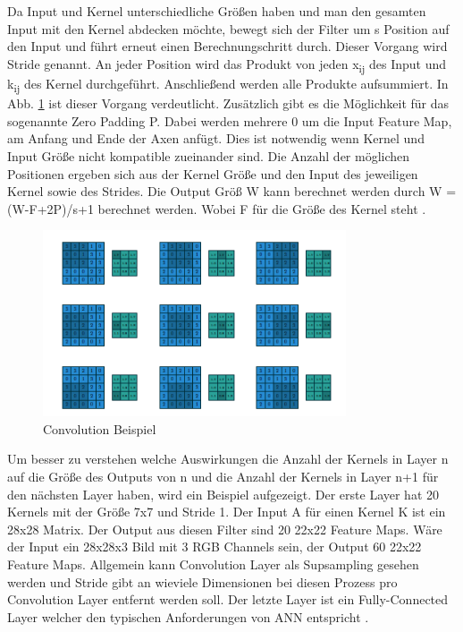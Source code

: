\documentclass{llncs}
\begin{document}
\\\\
Da Input und Kernel unterschiedliche Größen haben und man den gesamten Input mit den Kernel abdecken möchte, bewegt sich der Filter um s Position auf den Input und führt erneut einen Berechnungschritt durch. Dieser Vorgang wird Stride genannt. An jeder Position wird das Produkt von jeden x\textsubscript{ij} des Input und k\textsubscript{ij} des Kernel durchgeführt.  Anschließend werden alle Produkte aufsummiert. In Abb. \ref{fig:Bild11} ist dieser Vorgang verdeutlicht. Zusätzlich gibt es die Möglichkeit für das sogenannte Zero Padding P. Dabei werden mehrere 0 um die Input Feature Map, am Anfang und Ende der Axen anfügt. Dies ist notwendig wenn Kernel und Input Größe nicht kompatible zueinander sind. Die Anzahl der möglichen Positionen ergeben sich aus der Kernel Größe und den Input des jeweiligen Kernel sowie des Strides. Die Output Größ W kann berechnet werden durch W = (W-F+2P)/s+1 berechnet werden. Wobei F für die Größe des Kernel steht \cite{conv}.
\newpage
\begin{figure}
	\centering
	\includegraphics[width=0.8\textwidth]{conv.png}
	\caption{Convolution Beispiel\protect\cite{conv}}
	\label{fig:Bild11}
\end{figure}
Um  besser zu verstehen welche Auswirkungen die Anzahl der Kernels in Layer n auf die Größe des Outputs von n und die Anzahl der Kernels in Layer n+1 für den nächsten Layer haben, wird ein Beispiel aufgezeigt. Der erste Layer hat 20 Kernels mit der Größe 7x7 und Stride 1. Der Input A für einen Kernel K ist ein 28x28 Matrix. Der Output aus diesen Filter sind 20 22x22 Feature Maps. Wäre der Input ein 28x28x3 Bild mit 3 RGB Channels sein, der Output 60 22x22 Feature Maps. Allgemein kann Convolution Layer als Supsampling gesehen werden und Stride gibt an wieviele Dimensionen bei diesen Prozess pro Convolution Layer entfernt werden soll. Der letzte Layer ist ein Fully-Connected Layer welcher den typischen Anforderungen von ANN entspricht \cite{conv}.  
\end{document}
